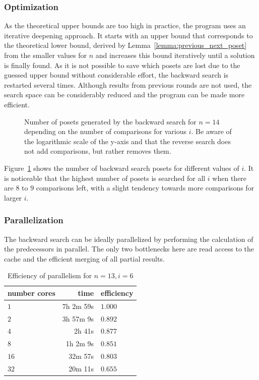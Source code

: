 \documentclass[10pt,journal,compsoc]{IEEEtran}
\begin{document}
\subsubsection{Optimization}

As the theoretical upper bounds are too high in practice, the program uses an iterative deepening approach.
It starts with an upper bound that corresponds to the theoretical lower bound, derived by Lemma~\ref{lemma:previous_next_poset} from the smaller values for $n$ and increases this bound iteratively until a solution is finally found.
As it is not possible to save which posets are lost due to the guessed upper bound without considerable effort, the backward search is restarted several times.
Although results from previous rounds are not used, the search space can be considerably reduced and the program can be made more efficient.

\begin{figure}[!b]
  \centering
  
  \caption{Number of posets generated by the backward search for $n = 14$ depending on the number of comparisons for various $i$. Be aware of the logarithmic scale of the y-axis and that the reverse search does not add comparisons, but rather removes them.}
  \label{fig:backward-posets-per-level}
\end{figure}

Figure~\ref{fig:backward-posets-per-level} shows the number of backward search posets for different values of $i$.
It is noticeable that the highest number of posets is searched for all $i$ when there are $8$ to $9$ comparisons left, with a slight tendency towards more comparisons for larger $i$.


\subsubsection{Parallelization} \label{sec:backward:parallelisation}

The backward search can be ideally parallelized by performing the calculation of the predecessors in parallel.
The only two bottlenecks here are read access to the cache and the efficient merging of all partial results.

\begin{table}[!t]
  \renewcommand{\arraystretch}{1.2}
  \caption{Efficiency of parallelism for $n = 13, i = 6$}
  \label{table:backward-parallel}
  \centering
  \begin{tabular}{l|r|l}
    number cores & time      & efficiency \\
    \hline
    $1$          & 7h 2m 59s & $1.000$    \\
    $2$          & 3h 57m 9s & $0.892$    \\
    $4$          & 2h 41s    & $0.877$    \\
    $8$          & 1h 2m 9s  & $0.851$    \\
    $16$         & 32m 57s   & $0.803$    \\
    $32$         & 20m 11s   & $0.655$    \\ %
  \end{tabular}
\end{table}
\end{document}

